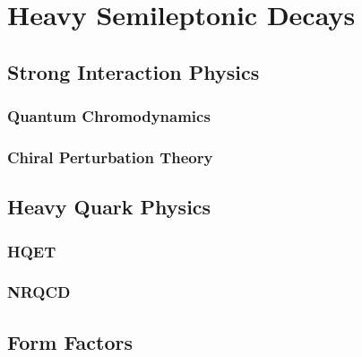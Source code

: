 \chapter{Heavy Semileptonic Decays}
\label{chap:semileptonic}

\section{Strong Interaction Physics}
\subsection{Quantum Chromodynamics}
\subsection{Chiral Perturbation Theory}
\section{Heavy Quark Physics}
\subsection{HQET}
\subsection{NRQCD}

\section{Form Factors}

